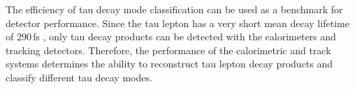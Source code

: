 The efficiency of tau decay mode classification can be used as a benchmark for detector performance. Since the tau lepton has a very short mean decay lifetime of 290\,fs \cite{Abreu:1991jn}, only tau decay products can be detected with the calorimeters and tracking detectors. Therefore, the performance of the calorimetric and track systems determines the ability to reconstruct tau lepton decay products and classify different tau decay modes.

